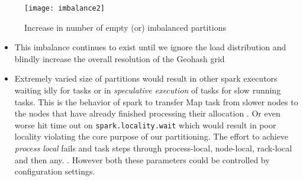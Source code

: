 \documentclass[article,type=msc,colorback,10pt,accentcolor=tud1d]{tudthesis}
\begin{document}
				
				\begin{figure}[hp]
					\centering
					\texttt{[image: imbalance2]}
					\caption{Increase in number of empty (or) imbalanced partitions}
					\label{fig:imbalance2}
				\end{figure}
			
			\clearpage
		
		\begin{itemize}
			\item This imbalance continues to exist until we ignore the load distribution and blindly increase the overall resolution of the Geohash grid
			\item Extremely varied size of partitions would result in other spark executors waiting idly for tasks or in \textit{speculative execution} of tasks for slow running tasks. This is the behavior of spark to  transfer Map task from slower nodes to the nodes that have already finished processing their allocation \cite{sparkspeculation}. Or even worse hit time out on \texttt{spark.locality.wait} which would result in poor locality violating the core purpose of our partitioning. The effort to achieve \textit{process local} fails and task steps through process-local, node-local, rack-local and then any. \cite{sparkconfiguration}. However both these parameters could be controlled by configuration settings.
		\end{itemize}

		
\end{document}
